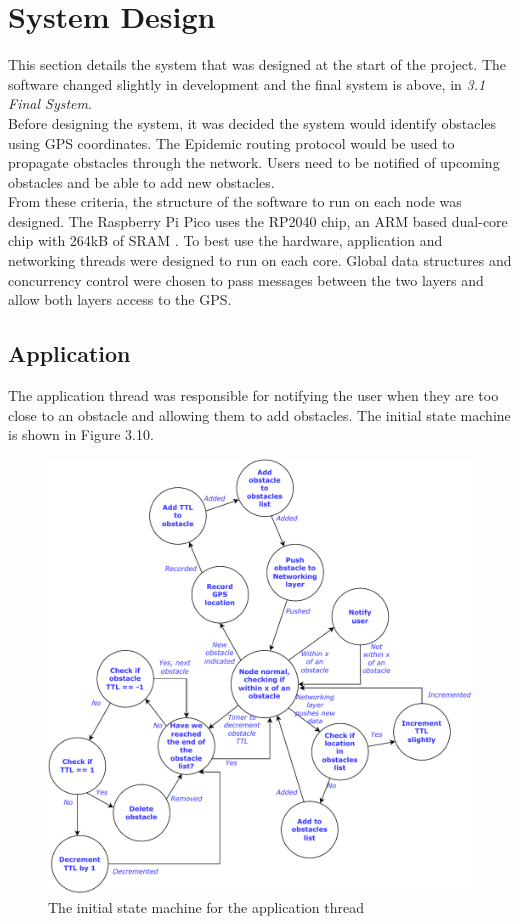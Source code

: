 \documentclass[12pt,a4paper]{report}
\begin{document}
\section{System Design}
This section details the system that was designed at the start of the project. The software changed slightly in development and the final system is above, in \emph{3.1 Final System}. \\
Before designing the system, it was decided the system would identify obstacles using GPS coordinates. The Epidemic routing protocol would be used to propagate obstacles through the network. Users need to be notified of upcoming obstacles and be able to add new obstacles. \\
From these criteria, the structure of the software to run on each node was designed. The Raspberry Pi Pico uses the RP2040 chip, an ARM based dual-core chip with 264kB of SRAM \cite{rp2040}. To best use the hardware, application and networking threads were designed to run on each core. Global data structures and concurrency control were chosen to pass messages between the two layers and allow both layers access to the GPS. \\ 


\subsection{Application}
The application thread was responsible for notifying the user when they are too close to an obstacle and allowing them to add obstacles. The initial state machine is shown in Figure 3.10. 
\begin{figure}[h]
\begin{center}
\includegraphics[scale=0.6]{app.pdf}
\end{center}
\caption{The initial state machine for the application thread}
\end{figure}
\FloatBarrier
\end{document}

